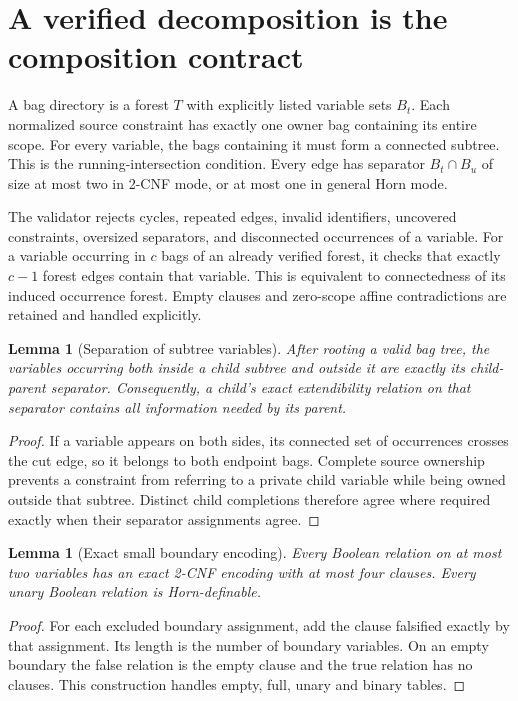 \documentclass[11pt]{article}
\newtheorem{lemma}[theorem]{Lemma}
\begin{document}
\section{A verified decomposition is the composition contract}
A bag directory is a forest \(T\) with explicitly listed variable sets
\(B_t\). Each normalized source constraint has exactly one owner bag
containing its entire scope. For every variable, the bags containing it
must form a connected subtree. This is the running-intersection condition.
Every edge has separator \(B_t\cap B_u\) of size at most two in 2-CNF
mode, or at most one in general Horn mode.

The validator rejects cycles, repeated edges, invalid identifiers, uncovered
constraints, oversized separators, and disconnected occurrences of a variable.
For a variable occurring in \(c\) bags of an already verified forest, it
checks that exactly \(c-1\) forest edges contain that variable. This is
equivalent to connectedness of its induced occurrence forest. Empty clauses
and zero-scope affine contradictions are retained and handled explicitly.

\begin{lemma}[Separation of subtree variables]
After rooting a valid bag tree, the variables occurring both inside a child
subtree and outside it are exactly its child-parent separator.
Consequently, a child's exact extendibility relation on that separator
contains all information needed by its parent.
\end{lemma}
\begin{proof}
If a variable appears on both sides, its connected set of occurrences crosses
the cut edge, so it belongs to both endpoint bags. Complete source ownership
prevents a constraint from referring to a private child variable while being
owned outside that subtree. Distinct child completions therefore agree
where required exactly when their separator assignments agree.
\end{proof}

\begin{lemma}[Exact small boundary encoding]
Every Boolean relation on at most two variables has an exact 2-CNF encoding
with at most four clauses. Every unary Boolean relation is Horn-definable.
\end{lemma}
\begin{proof}
For each excluded boundary assignment, add the clause falsified exactly by
that assignment. Its length is the number of boundary variables. On an empty
boundary the false relation is the empty clause and the true relation has
no clauses. This construction handles empty, full, unary and binary tables.
\end{proof}
\end{document}
